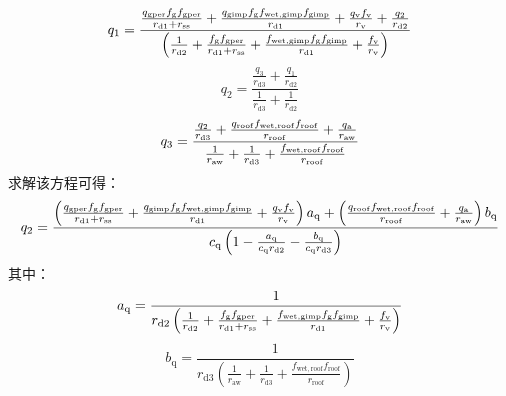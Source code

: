 \begin{equation}
  \label{3lay_q1_veg}
  q_{1} = \frac{\frac{q_{\mathrm{gper}} f_{\mathrm{g}} f_{\mathrm{gper}}}{r_{\mathrm{d1}} + r_{\mathrm{ss}}} + \frac{q_{\mathrm{gimp}} f_{\mathrm{g}} f_{\mathrm{wet,gimp}} f_{\mathrm{gimp}}}{r_{\mathrm{d1}}} + \frac{q_{\mathrm{v}} f_{\rm v}}{r_{\mathrm{v}}} + \frac{q_{2}}{r_{\mathrm{d2}}}}{\left(\frac{1}{r_{\mathrm{d2}}} + \frac{f_{\mathrm{g}} f_{\mathrm{gper}}}{r_{\mathrm{d1}} + r_{\mathrm{ss}}} + \frac{f_{\mathrm{wet,gimp}} f_{\mathrm{g}} f_{\mathrm{gimp}}}{r_{\mathrm{d1}}}+\frac{f_{\rm v}}{r_{\mathrm{v}}}\right)}
\end{equation}
%
\begin{equation}
  q_{2} = \frac{\frac{q_{3}}{r_{\mathrm{d3}}} + \frac{q_{1}}{r_{\mathrm{d2}}}}{\frac{1}{r_{\mathrm{d3}}} + \frac{1}{r_{\mathrm{d2}}}}
\end{equation}
%
\begin{equation}
  \label{3lay_q3_veg}
  q_{3} = \frac{ \frac{q_{\mathrm{2}}}{r_{\mathrm{d3}}} + \frac{q_{\mathrm{roof}} f_{\mathrm{wet,roof}} f_{\mathrm{roof}}}{r_{\mathrm{roof}}} + \frac{q_{\rm a}}{r_{\mathrm{aw}}} }{ \frac{1}{r_{\mathrm{aw}}} + \frac{1}{r_{\mathrm{d3}}} + \frac{f_{\mathrm{wet,roof}} f_{\mathrm{roof}}}{r_{\mathrm{roof}}} }
\end{equation}
求解该方程可得：
\begin{equation}
  q_{2} = \\
  \frac{\left(\frac{q_{\mathrm{gper}} f_{\mathrm{g}} f_{\mathrm{gper}}}{r_{\mathrm{d1}}+r_{\mathrm{ss}}} + \frac{q_{\mathrm{gimp}} f_{\mathrm{g}} f_{\mathrm{wet,gimp}} f_{\mathrm{gimp}}}{r_{\mathrm{d1}}} + \frac{q_{\mathrm{v}} f_{\rm v}}{r_{\mathrm{v}}}\right)a_{\mathrm{q}} + \left(\frac{q_{\mathrm{roof}} f_{\mathrm{wet,roof}} f_{\mathrm{roof}}}{r_{\mathrm{roof}}} + \frac{q_{\rm a}}{r_{\mathrm{aw}}}\right)b_{\mathrm{q}} }{c_{\mathrm{q}} \left( 1 - \frac{a_{\mathrm{q}}}{c_{\mathrm{q}} r_{\mathrm{d2}}} - \frac{b_{\mathrm{q}}}{c_{\mathrm{q}} r_{\mathrm{d3}}} \right)}
\end{equation}
其中：
\begin{equation}
  a_{\mathrm{q}}= \frac{1}{r_{\mathrm{d2}} \left( \frac{1}{r_{\mathrm{d2}}} + \frac{f_{\mathrm{g}} f_{\mathrm{gper}}}{r_{\mathrm{d1}} + r_{\mathrm{ss}}} + \frac{f_{\mathrm{wet,gimp}} f_{\mathrm{g}} f_{\mathrm{gimp}}}{r_{\mathrm{d1}}}+\frac{f_{\rm v}}{r_{\mathrm{v}}} \right)}
\end{equation}
%
\begin{equation}
  b_{\mathrm{q}} = \frac{1}{r_{\mathrm{d3}} \left( \frac{1}{r_{\mathrm{aw}}} + \frac{1}{r_{\mathrm{d3}}} + \frac{f_{\mathrm{wet,roof}} f_{\mathrm{roof}}}{r_{\mathrm{roof}}} \right)}
\end{equation}
